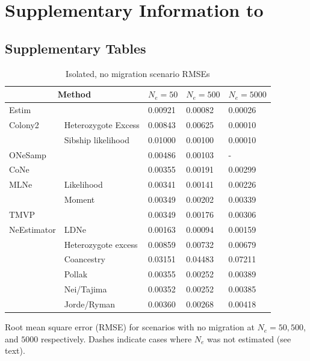 \chapter{Supplementary Information to }

\section{Supplementary Tables}


\begin{table}[h]
\centering \small
\caption[Isolated, no migration scenario RMSEs]{Isolated, no migration scenario RMSEs}
\label{tab:ne1}
\begin{tabular}{ | l | l | l | l | l | }
\hline
\multicolumn{2}{c}{Method} & $N_e = 50$ &  $N_e = 500$ &  $N_e = 5000$ \\ \hline
Estim 	&  & 0.00921	& 0.00082 & 0.00026 \\ \hline
Colony2 	& Heterozygote Excess & 0.00843 & 0.00625 & 0.00010 \\ \hline
 		& Sibship likelihood & 0.01000 & 0.00100 & 0.00010 \\ \hline
ONeSamp &  			& 0.00486 & 0.00103 & -  \\ \hline
CoNe 	&  			& 0.00355 & 0.00191 & 0.00299 \\ \hline
MLNe 	& Likelihood 	& 0.00341 & 0.00141 & 0.00226 \\ \hline
 		& Moment 	& 0.00349 & 0.00202 & 0.00339 \\ \hline
TMVP 	&  			& 0.00349 & 0.00176 & 0.00306 \\ \hline
NeEstimator & LDNe 	& 0.00163 & 0.00094 & 0.00159 \\ \hline
 		& Heterozygote excess & 0.00859 & 0.00732 & 0.00679 \\ \hline
 		& Coancestry 	& 0.03151 & 0.04483 & 0.07211 \\ \hline
 		& Pollak 		& 0.00355 & 0.00252 & 0.00389 \\ \hline
		 & Nei/Tajima 	& 0.00352 & 0.00252 & 0.00385 \\ \hline
 		& Jorde/Ryman & 0.00360 & 0.00268 & 0.00418 \\ \hline
\end{tabular}
\bigskip{}
{\footnotesize Root mean square error (RMSE) for scenarios with no migration at $N_e = 50, 500$, and $5000$ respectively. Dashes indicate cases where $N_e$ was not estimated (see text).}
\end{table}


